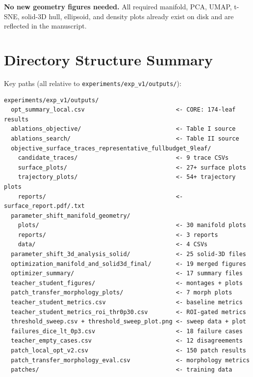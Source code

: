 \documentclass[11pt,a4paper]{article}
\newcommand{\filepath}[1]{\texttt{\small #1}}
\begin{document}
\textbf{No new geometry figures needed.}  All required manifold, PCA, UMAP, t-SNE, solid-3D hull, ellipsoid, and density plots already exist on disk and are reflected in the manuscript.

\section{Directory Structure Summary}

Key paths (all relative to \filepath{experiments/exp\_v1/outputs/}):

\begin{verbatim}
experiments/exp_v1/outputs/
  opt_summary_local.csv                          <- CORE: 174-leaf results
  ablations_objective/                           <- Table I source
  ablations_search/                              <- Table II source
  objective_surface_traces_representative_fullbudget_9leaf/
    candidate_traces/                            <- 9 trace CSVs
    surface_plots/                               <- 27+ surface plots
    trajectory_plots/                            <- 54+ trajectory plots
    reports/                                     <- surface_report.pdf/.txt
  parameter_shift_manifold_geometry/
    plots/                                       <- 30 manifold plots
    reports/                                     <- 3 reports
    data/                                        <- 4 CSVs
  parameter_shift_3d_analysis_solid/             <- 25 solid-3D files
  optimization_manifold_and_solid3d_final/       <- 19 merged figures
  optimizer_summary/                             <- 17 summary files
  teacher_student_figures/                       <- montages + plots
  patch_transfer_morphology_plots/               <- 7 morph plots
  teacher_student_metrics.csv                    <- baseline metrics
  teacher_student_metrics_roi_thr0p30.csv        <- ROI-gated metrics
  threshold_sweep.csv + threshold_sweep_plot.png <- sweep data + plot
  failures_dice_lt_0p3.csv                       <- 18 failure cases
  teacher_empty_cases.csv                        <- 12 disagreements
  patch_local_opt_v2.csv                         <- 150 patch results
  patch_transfer_morphology_eval.csv             <- morphology metrics
  patches/                                       <- training data
\end{verbatim}

\end{document}
